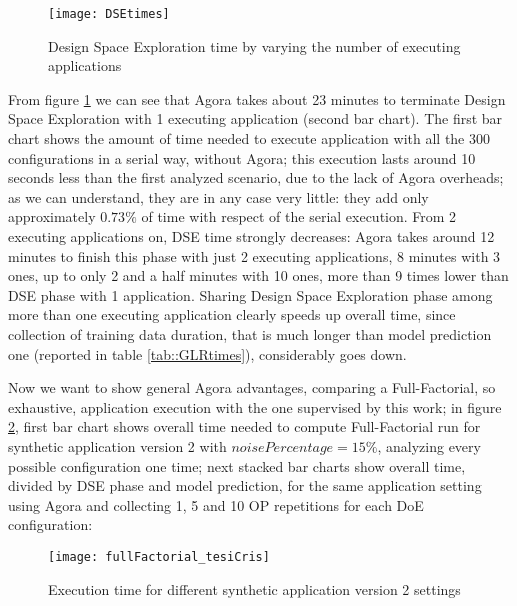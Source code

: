 \begin{figure}[h]

    \centering
    \texttt{[image: DSEtimes]}
    \caption{Design Space Exploration time by varying the number of executing applications}
    \label{fig::DSEtimes}
    
\end{figure}

From figure \ref{fig::DSEtimes} we can see that Agora takes about 23 minutes to terminate Design Space Exploration with 1 executing application (second bar chart). The first bar chart shows the amount of time needed to execute application with all the 300 configurations in a serial way, without Agora; this execution lasts around 10 seconds less than the first analyzed scenario, due to the lack of Agora overheads; as we can understand, they are in any case very little: they add only approximately $0.73\%$ of time with respect of the serial execution. From 2 executing applications on, DSE time strongly decreases: Agora takes around 12 minutes to finish this phase with just 2 executing applications, 8 minutes with 3 ones, up to only 2 and a half minutes with 10 ones, more than 9 times lower than DSE phase with 1 application. Sharing Design Space Exploration phase among more than one executing application clearly speeds up overall time, since collection of training data duration, that is much longer than model prediction one (reported in table \ref{tab::GLRtimes}), considerably goes down.

Now we want to show general Agora advantages, comparing a Full-Factorial, so exhaustive, application execution with the one supervised by this work; in figure \ref{fig::full_cris}, first bar chart shows overall time needed to compute Full-Factorial run for synthetic application version 2 with $noisePercentage = 15\%$, analyzing every possible configuration one time; next stacked bar charts show overall time, divided by DSE phase and model prediction, for the same application setting using Agora and collecting 1, 5 and 10 OP repetitions for each DoE configuration:

\begin{figure}[h]

    \centering
    \texttt{[image: fullFactorial\_tesiCris]}
    \caption{Execution time for different synthetic application version 2 settings}
    \label{fig::full_cris}
    
\end{figure}

